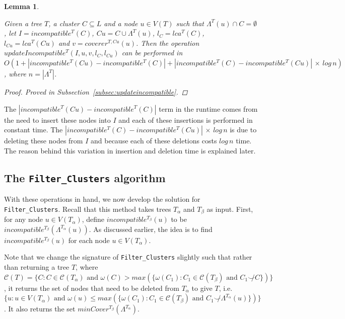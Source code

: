 \documentclass{article}
\newcommand{\compatible}{\smile}
\newcommand{\leafset}{\Lambda}
\newcommand{\weight}{\omega}
\newcommand{\TA}{T_\alpha}
\newcommand{\TB}{T_\beta}
\newtheorem{incompatibilityruntime}[incompatibility]{Lemma}
\begin{document}
    \begin{incompatibilityruntime}
        \label{lem:incompatibilityruntime}

        Given a tree $T$, a cluster $C \subseteq L$ and a node $u \in V(T)$ such that $\leafset^{T}(u) \cap C = \emptyset$, let $I = incompatible^{T}(C)$, $Cu = C \cup \leafset^{T}(u)$, $l_C = lca^{T}(C)$, $l_{Cu} = lca^{T}(Cu)$ and $v = coverer^{T, Cu}(u)$. Then the operation $updateIncompatible^{T}(I, u, v, l_C, l_{Cu})$ can be performed in $O(1 + |incompatible^{T}(Cu) - incompatible^{T}(C)| + |incompatible^{T}(C) - incompatible^{T}(Cu)|\,\times\,log\,n)$, where $n = |\leafset^{T}|$.

        \begin{proof}
            Proved in Subsection~\ref{subsec:updateincompatible}.
        \end{proof}
    \end{incompatibilityruntime}

    The $|incompatible^{T}(Cu) - incompatible^{T}(C)|$ term in the runtime comes from the need to insert these nodes into $I$ and each of these insertions is performed in constant time. The $|incompatible^{T}(C) - incompatible^{T}(Cu)|\,\times\,log\,n$ is due to deleting these nodes from $I$ and because each of these deletions costs $log\,n$ time. The reason behind this variation in insertion and deletion time is explained later.

    \subsection{The \texttt{Filter\_Clusters} algorithm}
    \label{subsec:filterclusters}

    With these operations in hand, we now develop the solution for \texttt{Filter\_Clusters}. Recall that this method takes trees $\TA$ and $\TB$ as input. First, for any node $u \in V(\TA)$, define $incompatible^{\TB}(u)$ to be $incompatible^{\TB}(\leafset^{\TA}(u))$. As discussed earlier, the idea is to find $incompatible^{\TB}(u)$ for each node $u \in V(\TA)$.

    Note that we change the signature of \texttt{Filter\_Clusters} slightly such that rather than returning a tree $T$, where $\mathcal{C}(T) = \{C : C \in \mathcal{C}(\TA) \text{ and } \weight(C) > max(\{\weight(C_1) : C_1 \in \mathcal{C}(\TB) \text{ and } C_1 \not\compatible C\})\}$, it returns the set of nodes that need to be deleted from $\TA$ to give $T$, i.e. $\{u : u \in V(\TA) \text{ and } \weight(u) \leq max(\{\weight(C_1) : C_1 \in \mathcal{C}(\TB) \text{ and } C_1 \not\compatible \leafset^{\TA}(u)\})\}$. It also returns the set $minCover^{\TB}(\leafset^{\TA})$.
\end{document}
